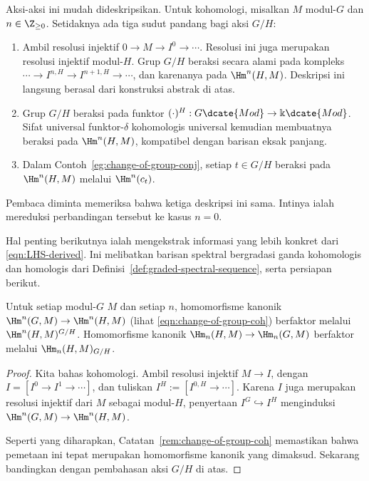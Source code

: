 Aksi-aksi ini mudah dideskripsikan. Untuk kohomologi, misalkan $M$ modul-$G$
dan $n\in\Z_{\geq0}$. Setidaknya ada tiga sudut pandang bagi aksi $G/H$:
\begin{enumerate}
	\item Ambil resolusi injektif $0\to M\to I^0\to\cdots$. Resolusi ini juga
	merupakan resolusi injektif modul-$H$. Grup $G/H$ beraksi secara alami pada
	kompleks $\cdots\to I^{n,H}\to I^{n+1,H}\to\cdots$, dan karenanya pada
	$\Hm^n(H,M)$. Deskripsi ini langsung berasal dari konstruksi abstrak di
	atas.
	\item Grup $G/H$ beraksi pada funktor
	$(\cdot)^H:G\dcate{Mod}\to\Bbbk\dcate{Mod}$. Sifat universal funktor-$\delta$
	kohomologis universal kemudian membuatnya beraksi pada $\Hm^n(H,M)$,
	kompatibel dengan barisan eksak panjang.
	\item Dalam Contoh~\ref{eg:change-of-group-conj}, setiap $t\in G/H$ beraksi
	pada $\Hm^n(H,M)$ melalui $\Hm^n(c_t)$.
\end{enumerate}
Pembaca diminta memeriksa bahwa ketiga deskripsi ini sama. Intinya ialah
mereduksi perbandingan tersebut ke kasus $n=0$.

Hal penting berikutnya ialah mengekstrak informasi yang lebih konkret dari
\eqref{eqn:LHS-derived}. Ini melibatkan barisan spektral bergradasi ganda
kohomologis dan homologis dari Definisi~\ref{def:graded-spectral-sequence},
serta persiapan berikut.

\begin{lemma}\label{prop:LHS-action-aux}
	Untuk setiap modul-$G$ $M$ dan setiap $n$, homomorfisme kanonik
	$\Hm^n(G,M)\to\Hm^n(H,M)$ (lihat \eqref{eqn:change-of-group-coh}) berfaktor
	melalui $\Hm^n(H,M)^{G/H}$. Homomorfisme kanonik
	$\Hm_n(H,M)\to\Hm_n(G,M)$ berfaktor melalui
	$\Hm_n(H,M)_{G/H}$.
\end{lemma}
\begin{proof}
	Kita bahas kohomologi. Ambil resolusi injektif $M\to I$, dengan
	$I=[I^0\to I^1\to\cdots]$, dan tuliskan
	$I^H:=[I^{0,H}\to\cdots]$. Karena $I$ juga merupakan resolusi injektif dari
	$M$ sebagai modul-$H$, penyertaan $I^G\hookrightarrow I^H$ menginduksi
	$\Hm^n(G,M)\to\Hm^n(H,M)$.

	Seperti yang diharapkan, Catatan~\ref{rem:change-of-group-coh} memastikan
	bahwa pemetaan ini tepat merupakan homomorfisme kanonik yang dimaksud.
	Sekarang bandingkan dengan pembahasan aksi $G/H$ di atas.
\end{proof}

